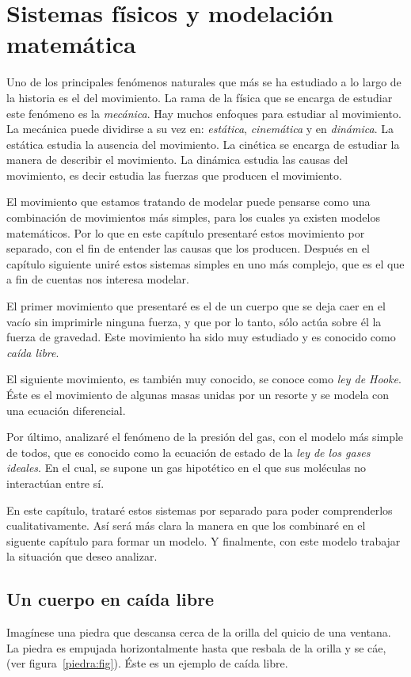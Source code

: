 \chapter{Sistemas físicos y modelación matemática}

Uno de los principales fenómenos naturales que más se ha estudiado a lo largo de la historia es el del movimiento.
La rama de la física que se encarga de estudiar este fenómeno es la \emph{mecánica}.
Hay muchos enfoques para estudiar al movimiento.
La mecánica puede dividirse a su vez en: \emph{estática}, \emph{cinemática} y en \emph{dinámica}.
La estática estudia la ausencia del movimiento.
La cinética se encarga de estudiar la manera de describir el movimiento.
La dinámica estudia las causas del movimiento, es decir estudia las fuerzas que producen el movimiento.

El movimiento que estamos tratando de modelar puede pensarse como una combinación de movimientos más simples, para los cuales ya existen modelos matemáticos.
Por lo que en este capítulo presentaré estos movimiento por separado, con el fin de entender las causas que los producen.
Después en el capítulo siguiente uniré estos sistemas simples en uno más complejo, que es el que a fin de cuentas nos interesa modelar.

El primer movimiento que presentaré es el de un cuerpo que se deja caer en el vacío sin imprimirle ninguna fuerza, y que por lo tanto, sólo actúa sobre él la fuerza de gravedad.
Este movimiento ha sido muy estudiado y es conocido como \emph{caída libre}. 

El siguiente movimiento, es también muy conocido, se conoce como \emph{ley de Hooke}.
Éste es el movimiento de algunas masas unidas por un resorte y se modela con una ecuación diferencial.

Por último, analizaré el fenómeno de la presión del gas, con el modelo más simple de todos, que es conocido como la ecuación de estado de la \emph{ley de los gases ideales}.
En el cual, se supone un gas hipotético en el que sus moléculas no interactúan entre sí.

En este capítulo, trataré estos sistemas por separado para poder comprenderlos cualitativamente.
Así será más clara la manera en que los combinaré en el siguente capítulo para formar un modelo.
Y finalmente, con este modelo trabajar la situación que deseo analizar.

\section{Un cuerpo en caída libre}
Imagínese una piedra que descansa cerca de la orilla del quicio de una ventana.
La piedra es empujada horizontalmente hasta que resbala de la orilla y se cáe, (ver figura~\ref{piedra:fig}).
Éste es un ejemplo de caída libre.

